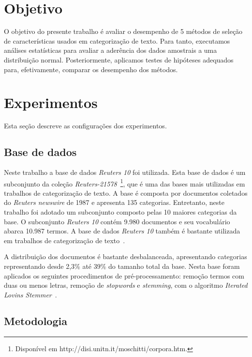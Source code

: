 \documentclass[conference]{IEEEtran}
\begin{document}
\section{Objetivo}
\label{sec:objetivo}

O objetivo do presente trabalho é avaliar o desempenho de 5 métodos de seleção de características usados em categorização de texto. Para tanto, executamos análises estatísticas para avaliar a aderência dos dados amostrais a uma distribuição normal. Posteriormente, aplicamos testes de hipóteses adequados para, efetivamente, comparar os desempenho dos métodos.


\section{Experimentos}
\label{sec:exp}

Esta seção descreve as configurações dos experimentos.

\subsection{Base de dados}
\label{sec:bd}

Neste trabalho a base de dados \textit{Reuters 10} foi utilizada. Esta base de dados é um subconjunto da coleção \textit{Reuters-21578}~\footnote{Disponível em http://disi.unitn.it/moschitti/corpora.htm.}, que é uma das bases
mais utilizadas em trabalhos de categorização de texto. A base é
composta por documentos coletados do \textit{Reuters newswire} de 1987 e apresenta 135
categorias. Entretanto, neste trabalho foi adotado um subconjunto composto pelas
10 maiores categorias da base. O subconjunto \textit{Reuters 10} contém 9.980 documentos
e seu vocabulário abarca 10.987 termos. A base de dados \textit{Reuters 10} também
é bastante utilizada em trabalhos de categorização de texto~\cite{chang2008multilabel,chen2009feature,yang2011new}. 

A distribuição dos documentos é bastante desbalanceada,
apresentando categorias representando desde 2,3\% até 39\% do tamanho total da
base. Nesta base foram aplicados os seguintes procedimentos de pré-processamento:
remoção termos com duas ou menos letras, remoção de \textit{stopwords} e \textit{stemming}, com o algoritmo \textit{Iterated Lovins
Stemmer}~\cite{lovins1968development}.


\subsection{Metodologia}
\label{sec:metodologia}
\end{document}
